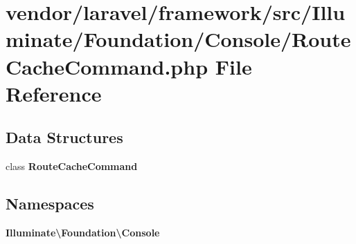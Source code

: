 \section{vendor/laravel/framework/src/\+Illuminate/\+Foundation/\+Console/\+Route\+Cache\+Command.php File Reference}
\label{_route_cache_command_8php}
\subsection*{Data Structures}
\begin{DoxyCompactItemize}
\item 
class {\bf Route\+Cache\+Command}
\end{DoxyCompactItemize}
\subsection*{Namespaces}
\begin{DoxyCompactItemize}
\item 
 {\bf Illuminate\textbackslash{}\+Foundation\textbackslash{}\+Console}
\end{DoxyCompactItemize}
